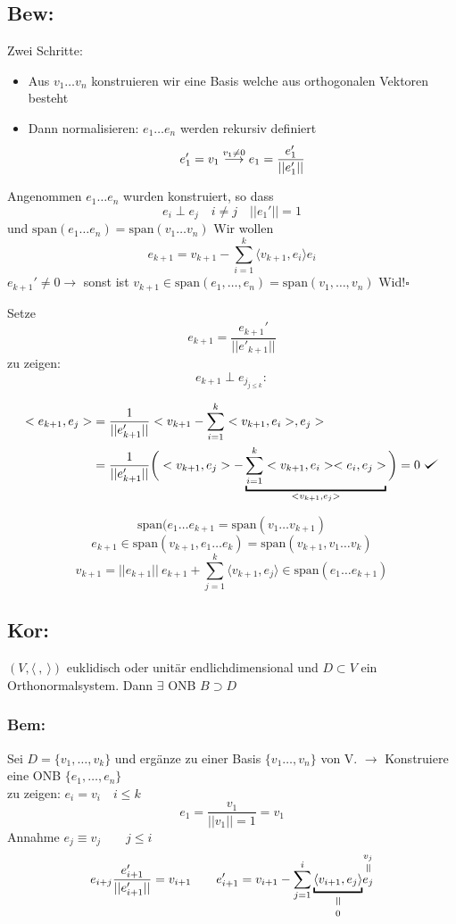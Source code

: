 \documentclass[titlepage,12pt,a4paper,ngerman]{report}
\newenvironment{bew}[1]{\subsection{Bew: #1}}{\hfill$\square$}
\def\checkmark{\tikz\fill[scale=0.4](0,.35) -- (.25,0) -- (1,.7) -- (.25,.15) -- cycle;}
\newcommand{\Bew}[2]{\begin{bew}{#1}#2\end{bew}}
\newcommand{\verteq}{\rotatebox{90}{$\,=$}}
\newcommand{\equalto}[2]{\underset{\scriptstyle\overset{\mkern4mu\verteq}{#2}}{#1}}
\newcommand{\equaltoup}[2]{\overset{\scriptstyle\underset{\mkern4mu\verteq}{#2}}{#1}}
\newcommand{\tx}[1]{\textrm{#1}}
\newcommand{\spa}{\tx{span}}
\newcommand{\summ}[2]{\sum_{#1}^{#2}}
\begin{document}
\Bew{}{Zwei Schritte: 
\begin{itemize}
	\item Aus $v_1 \dots v_n$ konstruieren wir eine Basis welche aus orthogonalen Vektoren besteht
	\item Dann normalisieren: $e_1 \dots e_n$ werden rekursiv definiert
	$$e_1' = v_1 \buildrel{v_1 \neq 0}\over{\longrightarrow} e_1 = \frac{e_1'}{||e_1'||}$$
\end{itemize}

Angenommen $e_1 \dots e_n$ wurden konstruiert, so dass $$e_i \perp e_j \quad i \neq j \quad ||e_1'|| = 1$$ und $\spa (e_1 \dots e_n) = \spa (v_1 \dots v_n)$ Wir wollen
$$e_{k+1} = v_{k +1} - \summ{i=1}{k} \langle v_{k+1}, e_i \rangle e_i$$
	$e_{k+1}' \neq 0 \rightarrow$ sonst ist $v_{k+1} \in \spa (e_1, \dots, e_n) = \spa (v_1, \dots, v_n)$ Wid!}

Setze 
$$ e_{k+1} = \frac{e_{k+1}'}{||e'_{k+1}||}$$
zu zeigen:
$$e_{k+1} \perp e_{j_{j \le k}} :$$

\begin{align*}
< e_{k+1},e_j> &= \frac{1}{||e'_{k+1}||} < v_{k+1} - \sum_{i=1}^{k}< v_{k+1} , e_i > ,e_j>\\
&=\frac{1}{||e'_{k+1}||} \bigg( <v_{k+1},e_j> - \underbracket{\sum_{i=1}^{k} <v_{k+1},e_i> < e_i,e_j>  }_{<v_{k+1},e_j>} \bigg) = 0 \ \checkmark
\end{align*}

$$\spa (e_1 \dots e_{k + 1} = \spa (v_1 \dots v_{k + 1})$$
$$e_{k + 1} \in \spa ( v_{k + 1}, e_1 \dots e_k) = \spa(v_{k+1},v_1 \dots v_k)$$
$$v_{k+1} = ||e_{k+1}||\ e_{k+1}+\summ{j=1}{k} \langle v_{k+1}, e_j \rangle \in \spa (e_1 \dots e_{k+1})$$

\subsection{Kor:}
$ (V,\langle \ ,\ \rangle) $ euklidisch oder unitär endlichdimensional und $ D \subset V $ ein Orthonormalsystem. Dann $ \exists $ ONB $ B \supset D $ 
\subsubsection{Bem:}
Sei $ D = \{v_1,\dots,v_k \} $ und ergänze zu einer Basis $ \{v_1 \dots,v_n \} $ von V. $ \rightarrow $ Konstruiere eine ONB $ \{e_1,\dots,e_n\} $\\
zu zeigen: $ e_i = v_i \quad i \le k $\\
$$ e_1 = \frac{v_1}{||v_1|| =1} = v_1 $$
Annahme $ e_j \equiv v_j \qquad j \le i $\\
$$ e_{i+j} \frac{e'_{i+1}}{||e'_{i+1}||} = v_{i+1} \qquad e'_{i+1} = v _{i+1} - \sum_{j=1}^{i} \equalto{\underbracket{\langle v_{i+1},e_j \rangle }}{0} \equaltoup{e_j}{v_j}$$ 
\end{document}

